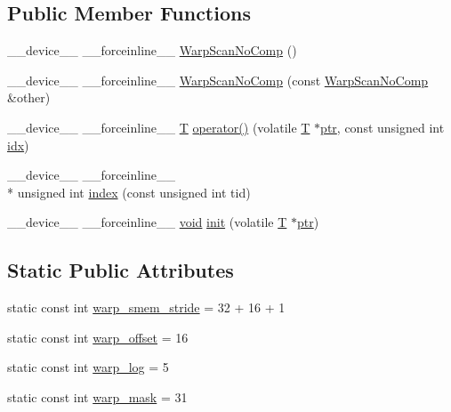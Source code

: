 \subsection*{Public Member Functions}
\begin{DoxyCompactItemize}
\item 
\-\_\-\-\_\-device\-\_\-\-\_\- \-\_\-\-\_\-forceinline\-\_\-\-\_\- \hyperlink{structcv_1_1gpu_1_1device_1_1WarpScanNoComp_a2d56eb6af397105aea4fb83f0870067d}{Warp\-Scan\-No\-Comp} ()
\item 
\-\_\-\-\_\-device\-\_\-\-\_\- \-\_\-\-\_\-forceinline\-\_\-\-\_\- \hyperlink{structcv_1_1gpu_1_1device_1_1WarpScanNoComp_a32e3e5837b0a4c569a927bc1aa5de16e}{Warp\-Scan\-No\-Comp} (const \hyperlink{structcv_1_1gpu_1_1device_1_1WarpScanNoComp}{Warp\-Scan\-No\-Comp} \&other)
\item 
\-\_\-\-\_\-device\-\_\-\-\_\- \-\_\-\-\_\-forceinline\-\_\-\-\_\- \hyperlink{calib3d_8hpp_a3efb9551a871ddd0463079a808916717}{T} \hyperlink{structcv_1_1gpu_1_1device_1_1WarpScanNoComp_a82cd9749e9aac43f31b2d9be300cde79}{operator()} (volatile \hyperlink{calib3d_8hpp_a3efb9551a871ddd0463079a808916717}{T} $\ast$\hyperlink{core__c_8h_a166529da793cc1ef241cff347f3db5a5}{ptr}, const unsigned int \hyperlink{core__c_8h_a5c7c842f447336aa2f10826df65a28b3}{idx})
\item 
\-\_\-\-\_\-device\-\_\-\-\_\- \-\_\-\-\_\-forceinline\-\_\-\-\_\- \\*
unsigned int \hyperlink{structcv_1_1gpu_1_1device_1_1WarpScanNoComp_a81ad497191b8ece1626e08d82ad9a4b7}{index} (const unsigned int tid)
\item 
\-\_\-\-\_\-device\-\_\-\-\_\- \-\_\-\-\_\-forceinline\-\_\-\-\_\- \hyperlink{legacy_8hpp_a8bb47f092d473522721002c86c13b94e}{void} \hyperlink{structcv_1_1gpu_1_1device_1_1WarpScanNoComp_a21cda591668635628dd81e870cc39b15}{init} (volatile \hyperlink{calib3d_8hpp_a3efb9551a871ddd0463079a808916717}{T} $\ast$\hyperlink{core__c_8h_a166529da793cc1ef241cff347f3db5a5}{ptr})
\end{DoxyCompactItemize}
\subsection*{Static Public Attributes}
\begin{DoxyCompactItemize}
\item 
static const int \hyperlink{structcv_1_1gpu_1_1device_1_1WarpScanNoComp_af09b471a616a150700286e74d72067aa}{warp\-\_\-smem\-\_\-stride} = 32 + 16 + 1
\item 
static const int \hyperlink{structcv_1_1gpu_1_1device_1_1WarpScanNoComp_acc5d0070713a56992f79870a26088853}{warp\-\_\-offset} = 16
\item 
static const int \hyperlink{structcv_1_1gpu_1_1device_1_1WarpScanNoComp_a4084327bde405e8f12f67b3df4f333df}{warp\-\_\-log} = 5
\item 
static const int \hyperlink{structcv_1_1gpu_1_1device_1_1WarpScanNoComp_a06a64367fc51636ce16d976cc62d7575}{warp\-\_\-mask} = 31
\end{DoxyCompactItemize}


